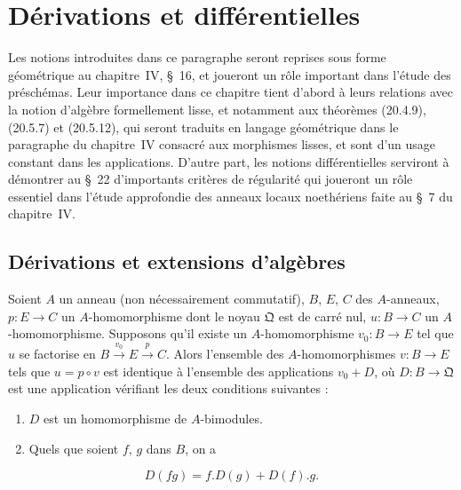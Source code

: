 \section{Dérivations et différentielles}
\label{section:0.20-fr}
\label{0.20-fr}

Les notions introduites dans ce paragraphe seront reprises sous forme
géométrique au chapitre~IV, §~16, et joueront un rôle important dans l'étude
des préschémas. Leur importance dans ce chapitre tient d'abord à leurs
relations avec la notion d'algèbre formellement lisse, et notamment aux
théorèmes (20.4.9), (20.5.7) et (20.5.12), qui seront traduits en langage
géométrique dans le paragraphe du chapitre~IV consacré aux morphismes lisses,
et sont d'un usage constant dans les applications. D'autre part, les notions
différentielles serviront à démontrer au §~22 d'importants critères de
régularité qui joueront un rôle essentiel dans l'étude approfondie des anneaux
locaux noethériens faite au §~7 du chapitre~IV.

\subsection{Dérivations et extensions d'algèbres}
\label{subsection:0.20.1-fr}

\begin{proposition}[20.1.1]
\label{0.20.1.1-fr}
Soient $A$ un anneau (non nécessairement commutatif), $B$, $E$, $C$ des
$A$-anneaux, $p:E\to C$ un $A$-homomorphisme dont le noyau $\mathfrak{Q}$
est de carré nul, $u:B\to C$ un $A$-homomorphisme. Supposons qu'il existe
un $A$-homomorphisme $v_0:B\to E$ tel que $u$ se factorise en
$B\xrightarrow{v_0}E\xrightarrow{p}C$. Alors l'ensemble des
$A$-homomorphismes $v:B\to E$ tels que $u=p\circ v$ est identique à
l'ensemble des applications $v_0+D$, où $D:B\to\mathfrak{Q}$ est une
application vérifiant les deux conditions suivantes :
\begin{enumerate}
  \item[\rm(i)] $D$ est un homomorphisme de $A$-bimodules.
  \item[\rm(ii)] Quels que soient $f$, $g$ dans $B$, on a
\end{enumerate}
\begin{equation}
\tag{20.1.1.1}
\label{0.20.1.1.1-fr}
  D(fg)=f.D(g)+D(f).g.
\end{equation}
\end{proposition}

